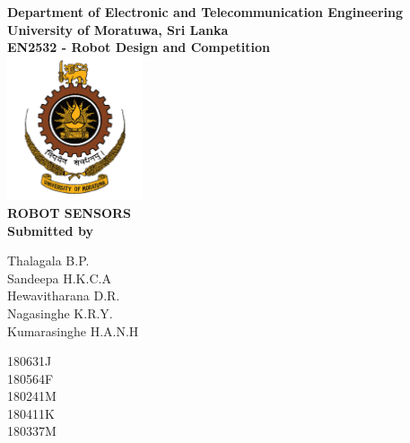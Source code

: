 \begin{titlepage}
\center %

\textbf{\large Department of Electronic and Telecommunication Engineering}\\[0.5cm]
\textbf{\Large University of Moratuwa, Sri Lanka}\\[1cm]
\textbf{\large EN2532 - Robot Design and Competition}\\[1cm]
\includegraphics[width=0.3\textwidth]{uomlogo.png}\\[2cm]

	
\textbf{\Huge{ROBOT SENSORS}  }\\[4cm]





\textbf{\large Submitted by}\\[0.5cm]
\begin{minipage}{0.32\textwidth}
	\begin{flushleft}
		{\large Thalagala B.P.	}\\[4mm]
		{\large Sandeepa H.K.C.A	}\\[4mm]
		{\large Hewavitharana D.R.	}\\[4mm]
		{\large Nagasinghe K.R.Y.		}\\[4mm]
		
		{\large Kumarasinghe H.A.N.H		}\\[4mm]
	\end{flushleft}
\end{minipage}
\hspace{5mm}
\begin{minipage}{0.32\textwidth}
	\begin{flushright}
		{\large 180631J  }\\[4mm]
		{\large 180564F  }\\[4mm]
		{\large 180241M }\\[4mm]
			{\large 180411K  }\\[4mm]
		{\large 180337M  }\\[4mm]
	\end{flushright}
\end{minipage}\\[2cm]



\end{titlepage}

